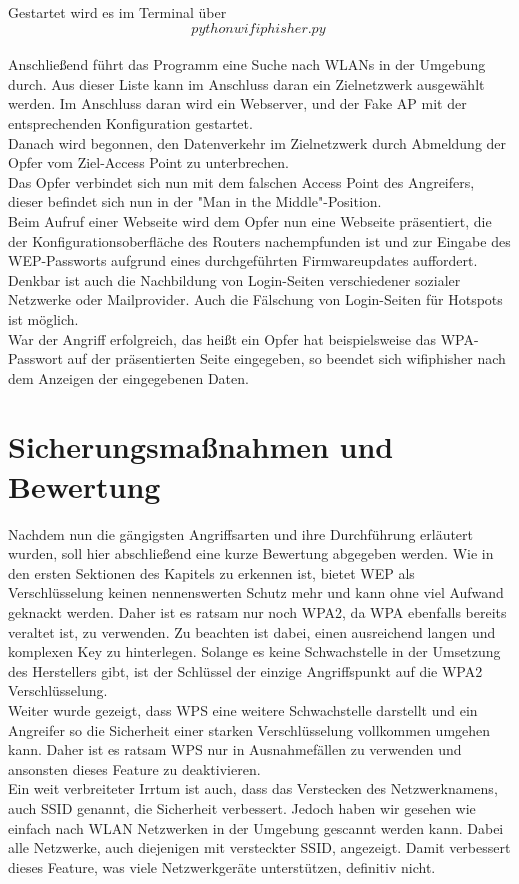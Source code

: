 Gestartet wird es im Terminal über 
$$python wifiphisher.py ~$$\\

Anschließend führt das Programm eine Suche nach WLANs in der Umgebung durch. Aus dieser Liste kann im Anschluss daran ein  Zielnetzwerk ausgewählt werden. Im Anschluss daran wird ein Webserver, und der Fake AP mit der entsprechenden Konfiguration gestartet. \\

Danach wird begonnen, den Datenverkehr im Zielnetzwerk durch Abmeldung der Opfer vom Ziel-Access Point zu unterbrechen. \\

Das Opfer verbindet sich nun mit dem falschen Access Point des Angreifers, dieser befindet sich nun in der "Man in the Middle"-Position. \\

Beim Aufruf einer Webseite wird dem Opfer nun eine Webseite präsentiert, die der Konfigurationsoberfläche des Routers nachempfunden ist und zur Eingabe des WEP-Passworts aufgrund eines durchgeführten Firmwareupdates auffordert. Denkbar ist auch die Nachbildung von Login-Seiten verschiedener sozialer Netzwerke oder Mailprovider. Auch die Fälschung von Login-Seiten für Hotspots ist möglich. \\

War der Angriff erfolgreich, das heißt ein Opfer hat beispielsweise das WPA-Passwort auf der präsentierten Seite eingegeben, so beendet sich wifiphisher nach dem Anzeigen der eingegebenen Daten.

\section{Sicherungsmaßnahmen und Bewertung}

Nachdem nun die gängigsten Angriffsarten und ihre Durchführung erläutert wurden, soll hier abschließend eine kurze Bewertung abgegeben werden. Wie in den ersten Sektionen des Kapitels zu erkennen ist, bietet WEP als Verschlüsselung keinen nennenswerten Schutz mehr und kann ohne viel Aufwand geknackt werden. Daher ist es ratsam nur noch WPA2, da WPA ebenfalls bereits veraltet ist, zu verwenden. Zu beachten ist dabei, einen ausreichend langen und komplexen Key zu hinterlegen. Solange es keine Schwachstelle in der Umsetzung des Herstellers gibt, ist der Schlüssel der einzige Angriffspunkt auf die WPA2 Verschlüsselung. \\

Weiter wurde gezeigt, dass WPS eine weitere Schwachstelle darstellt und ein Angreifer so die Sicherheit einer starken Verschlüsselung vollkommen umgehen kann. Daher ist es ratsam WPS nur in Ausnahmefällen zu verwenden und ansonsten dieses Feature zu deaktivieren. \\

Ein weit verbreiteter Irrtum ist auch, dass das Verstecken des Netzwerknamens, auch SSID genannt, die Sicherheit verbessert. Jedoch haben wir gesehen wie einfach nach WLAN Netzwerken in der Umgebung gescannt werden kann. Dabei alle Netzwerke, auch diejenigen mit versteckter SSID, angezeigt. Damit verbessert dieses Feature, was viele Netzwerkgeräte unterstützen, definitiv nicht. 


